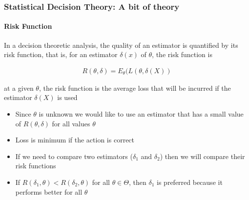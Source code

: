 \documentclass[
  shownotes,
  xcolor={svgnames},
  hyperref={colorlinks,citecolor=DarkBlue,linkcolor=DarkRed,urlcolor=DarkBlue}
  , aspectratio=169]{beamer}
\begin{document}
\begin{frame}
\frametitle{Statistical Decision Theory: A bit of theory}
\framesubtitle{Risk Function}
In a decision theoretic analysis, the quality of an estimator is quantified by its risk function, that is, for an estimator $\delta(x)$ of $\theta$, the risk function is

\begin{align}
      R(\theta,\delta)=E_\theta (L(\theta,\delta(X))
    \end{align}

    at a given $\theta$, the risk function is the average loss that will be incurred if the estimator $\delta(X)$ is used


\begin{itemize}
\item Since $\theta$ is unknown we would like to use an estimator that has a small value of $R(\theta,\delta)$ for all values $\theta$
\item Loss is minimum if the action is correct
\item If we need to compare two estimators ($\delta_1$ and $\delta_2$) then we will compare their risk functions
\item If $R(\delta_1,\theta)<R(\delta_2,\theta)$ for all $\theta \in \Theta$, then $\delta_1$ is preferred because it performs better for all $\theta$

\end{itemize}
\end{frame}
\end{document}
